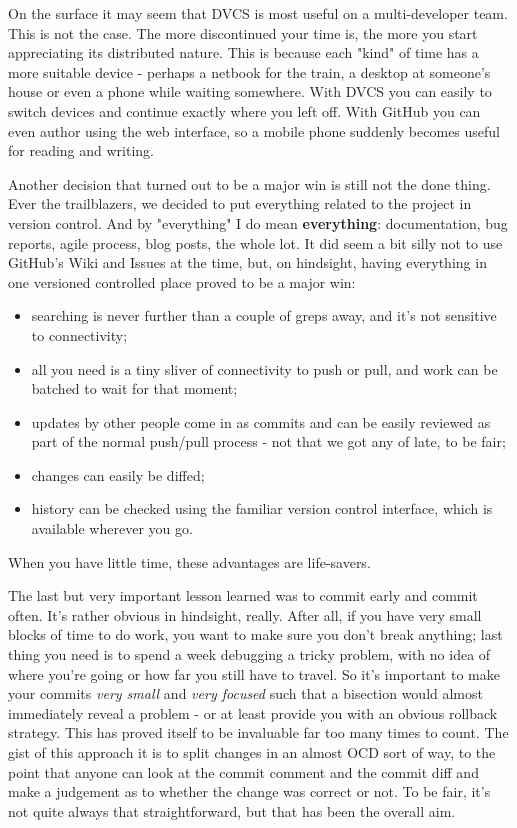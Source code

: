\documentclass{book}
\begin{document}
On the surface it may seem that DVCS is most useful on a
multi-developer team. This is not the case. The more discontinued your
time is, the more you start appreciating its distributed nature. This
is because each "kind" of time has a more suitable device - perhaps a
netbook for the train, a desktop at someone's house or even a phone
while waiting somewhere. With DVCS you can easily to switch devices
and continue exactly where you left off. With GitHub you can even
author using the web interface, so a mobile phone suddenly becomes
useful for reading and writing.

Another decision that turned out to be a major win is still not the
done thing. Ever the trailblazers, we decided to put everything
related to the project in version control. And by "everything" I do
mean \textbf{everything}: documentation, bug reports, agile process, blog
posts, the whole lot. It did seem a bit silly not to use GitHub's Wiki
and Issues at the time, but, on hindsight, having everything in one
versioned controlled place proved to be a major win:

\begin{itemize}
\item searching is never further than a couple of greps away, and it's not
sensitive to connectivity;
\item all you need is a tiny sliver of connectivity to push or pull, and
work can be batched to wait for that moment;
\item updates by other people come in as commits and can be easily
reviewed as part of the normal push/pull process - not that we got
any of late, to be fair;
\item changes can easily be diffed;
\item history can be checked using the familiar version control interface,
which is available wherever you go.
\end{itemize}

When you have little time, these advantages are life-savers.

The last but very important lesson learned was to commit early and
commit often. It's rather obvious in hindsight, really. After all, if
you have very small blocks of time to do work, you want to make sure
you don't break anything; last thing you need is to spend a week
debugging a tricky problem, with no idea of where you're going or how
far you still have to travel. So it's important to make your commits
\emph{very small} and \emph{very focused} such that a bisection would almost
immediately reveal a problem - or at least provide you with an obvious
rollback strategy. This has proved itself to be invaluable far too
many times to count. The gist of this approach it is to split changes
in an almost OCD sort of way, to the point that anyone can look at the
commit comment and the commit diff and make a judgement as to whether
the change was correct or not. To be fair, it's not quite always that
straightforward, but that has been the overall aim.
\end{document}
